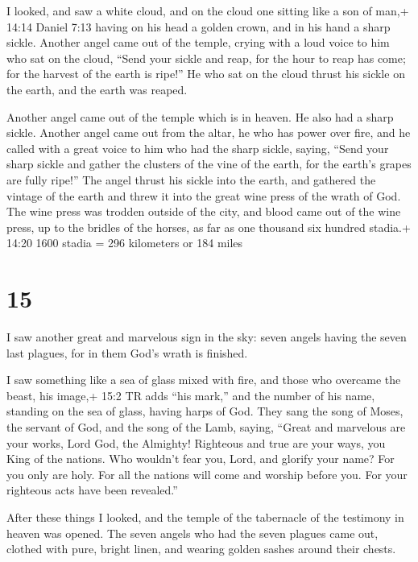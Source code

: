  I looked, and saw a white cloud, and on the cloud one
sitting like a son of man,+ 14:14 Daniel 7:13 having on his head a
golden crown, and in his hand a sharp sickle.  Another
angel came out of the temple, crying with a loud voice to him who sat on
the cloud, ``Send your sickle and reap, for the hour to reap has come;
for the harvest of the earth is ripe!''  He who sat on the
cloud thrust his sickle on the earth, and the earth was reaped.

 Another angel came out of the temple which is in heaven.
He also had a sharp sickle.  Another angel came out from
the altar, he who has power over fire, and he called with a great voice
to him who had the sharp sickle, saying, ``Send your sharp sickle and
gather the clusters of the vine of the earth, for the earth's grapes are
fully ripe!''  The angel thrust his sickle into the earth,
and gathered the vintage of the earth and threw it into the great wine
press of the wrath of God.  The wine press was trodden
outside of the city, and blood came out of the wine press, up to the
bridles of the horses, as far as one thousand six hundred stadia.+ 14:20
1600 stadia = 296 kilometers or 184 miles

\hypertarget{section-14}{%
\section{15}\label{section-14}}

 I saw another great and marvelous sign in the sky: seven
angels having the seven last plagues, for in them God's wrath is
finished.

 I saw something like a sea of glass mixed with fire, and
those who overcame the beast, his image,+ 15:2 TR adds ``his mark,'' and
the number of his name, standing on the sea of glass, having harps of
God.  They sang the song of Moses, the servant of God, and
the song of the Lamb, saying, ``Great and marvelous are your works, Lord
God, the Almighty! Righteous and true are your ways, you King of the
nations.  Who wouldn't fear you, Lord, and glorify your
name? For you only are holy. For all the nations will come and worship
before you. For your righteous acts have been revealed.''

 After these things I looked, and the temple of the
tabernacle of the testimony in heaven was opened.  The seven
angels who had the seven plagues came out, clothed with pure, bright
linen, and wearing golden sashes around their chests.

